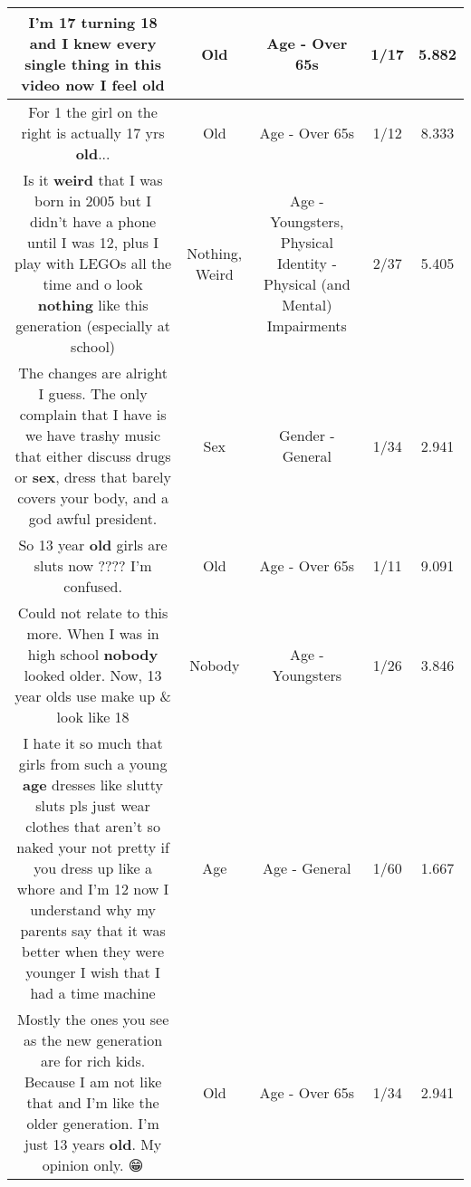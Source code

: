 \documentclass[11pt]{article}
\newlength\mylength
\begin{document}
\begin{center}
\begin{longtable}{|C{.65\mylength}|C{.30\mylength}|C{.12\mylength}|C{.12\mylength}|C{.12\mylength}|}
  \small I'm 17 turning 18 and I knew every single thing in this video now I feel old\normalsize   & Old & Age - Over 65s & 1/17 & 5.882 \\  \hline
  \small For 1 the girl on the right is actually 17 yrs \textbf{old}...\normalsize   & Old & Age - Over 65s & 1/12 & 8.333 \\  \hline
  \small Is it \textbf{weird} that I was born in 2005 but I didn't have a phone until I was 12, plus I play with LEGOs all the time and o look \textbf{nothing} like this generation (especially at school)\normalsize   & Nothing, Weird & Age - Youngsters, Physical Identity - Physical (and Mental) Impairments & 2/37 & 5.405 \\  \hline
  \small The changes are alright I guess. The only complain that I have is we have trashy music that either discuss drugs or \textbf{sex}, dress that barely covers your body, and a god awful president.\normalsize   & Sex & Gender - General & 1/34 & 2.941 \\  \hline
  \small So 13 year \textbf{old} girls are sluts now ???? I'm confused.\normalsize   & Old & Age - Over 65s & 1/11 & 9.091 \\  \hline
  \small Could not relate to this more.  When I was in high school \textbf{nobody} looked older. Now, 13 year olds use make up \& look like 18\normalsize   & Nobody & Age - Youngsters & 1/26 & 3.846 \\  \hline
  \small I hate it so much that girls from such a young \textbf{age} dresses like slutty sluts  pls just wear clothes that aren't so naked your not pretty if you dress up like a whore and I'm 12 now I understand why my parents say that it was better when they were younger I wish that I had a time machine\normalsize   & Age & Age - General & 1/60 & 1.667 \\  \hline
  \small Mostly the ones you see as the new generation are for rich kids. Because I am not like that and I'm like the older generation. I'm just 13 years \textbf{old}. My opinion only. 😁\normalsize   & Old & Age - Over 65s & 1/34 & 2.941 \\  \hline

\end{longtable}
\end{center}
\end{document}
